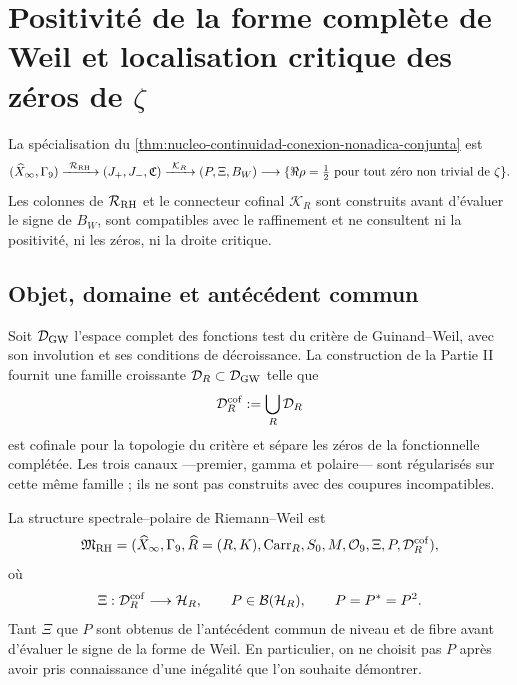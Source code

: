 \chapter[Positivité de Weil et localisation critique des zéros de zêta]{Positivité de la forme complète de Weil et localisation critique des zéros de \texorpdfstring{\(\zeta\)}{zêta}}

\noindent La spécialisation du
\cref{thm:nucleo-continuidad-conexion-nonadica-conjunta} est
\[
 (\widehat X_\infty,\Gamma_9)
 \xrightarrow{\ \mathcal R_{\rm RH}\ }
 (J_+,J_-,\mathfrak C)
 \xrightarrow{\ \mathcal K_R\ }
 (P,\Xi,B_W)
 \longrightarrow
 \{\Re\rho=\tfrac12\text{ pour tout zéro non trivial de }\zeta\}.
\]
Les colonnes de \(\mathcal R_{\rm RH}\) et le connecteur cofinal
\(\mathcal K_R\) sont construits avant d'évaluer le signe de \(B_W\), sont
compatibles avec le raffinement et ne consultent ni la positivité, ni les zéros, ni la
droite critique.

\section*{Objet, domaine et antécédent commun}

Soit \(\mathcal D_{\rm GW}\) l'espace complet des fonctions test du
critère de Guinand--Weil, avec son involution et ses conditions de décroissance.
La construction de la Partie II fournit une famille croissante
\(\mathcal D_R\subset\mathcal D_{\rm GW}\) telle que
\begin{equation}\label{eq:realizaciones-rh-clase-cofinal}
 \mathcal D_R^{\rm cof}:=\bigcup_R\mathcal D_R
\end{equation}
est cofinale pour la topologie du critère et sépare les zéros de la fonctionnelle
complétée. Les trois canaux ---premier, gamma et polaire--- sont régularisés sur
cette même famille ; ils ne sont pas construits avec des coupures incompatibles.

La structure spectrale--polaire de Riemann--Weil est
\begin{equation}\label{eq:realizaciones-rh-estructura}
 \mathfrak M_{\rm RH}=
 (\widehat X_\infty,\Gamma_9,\widehat R=(R,K),
  \operatorname{Carr}_R,S_0,M,\mathcal O_9,
  \Xi,P,\mathcal D_R^{\rm cof}),
\end{equation}
où
\begin{equation}\label{eq:realizaciones-rh-xi-p}
 \Xi:\mathcal D_R^{\rm cof}\longrightarrow\mathcal H_R,
 \qquad P\in\mathcal B(\mathcal H_R),
 \qquad P=P^*=P^2.
\end{equation}
Tant \(\Xi\) que \(P\) sont obtenus de l'antécédent commun de niveau et de fibre
avant d'évaluer le signe de la forme de Weil. En particulier, on ne choisit pas
\(P\) après avoir pris connaissance d'une inégalité que l'on souhaite démontrer.

